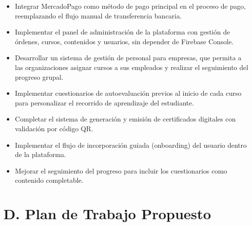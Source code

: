 \documentclass[12pt,a4paper]{article}
\begin{document}
\begin{itemize}[leftmargin=1.5cm]
  \item Integrar MercadoPago como método de pago principal en el proceso de pago, reemplazando el
        flujo manual de transferencia bancaria.
  \item Implementar el panel de administración de la plataforma con gestión de órdenes, cursos,
        contenidos y usuarios, sin depender de Firebase Console.
  \item Desarrollar un sistema de gestión de personal para empresas, que permita a las organizaciones
        asignar cursos a sus empleados y realizar el seguimiento del progreso grupal.
  \item Implementar cuestionarios de autoevaluación previos al inicio de cada curso para
        personalizar el recorrido de aprendizaje del estudiante.
  \item Completar el sistema de generación y emisión de certificados digitales con validación
        por código QR.
  \item Implementar el flujo de incorporación guiada (onboarding) del usuario dentro de la plataforma.
  \item Mejorar el seguimiento del progreso para incluir los cuestionarios como contenido completable.
\end{itemize}

\section*{D. Plan de Trabajo Propuesto}
\end{document}
